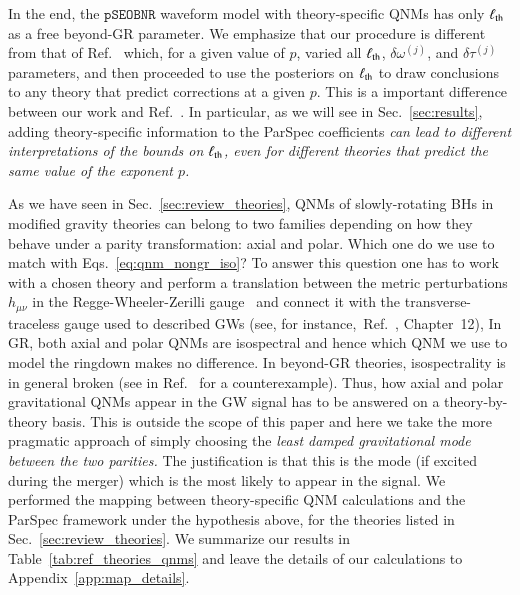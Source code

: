 \documentclass[twocolumn,
               prd,
               aps,
               superscriptaddress,
               tightenlines,
               nofootinbib,
               eqsecnum,
               amsfonts,
               amsmath,
               longbibliography]{revtex4-1}
\newcommand{\pSEOB}{\texttt{pSEOBNR}}
\begin{document}
In the end, the $\pSEOB$ waveform model with theory-specific
QNMs has only $\ell_{\rm th}$ as a free beyond-GR parameter.
%
We emphasize that our procedure is different from that of
Ref.~\cite{Carullo:2021dui} which, for a given value of $p$, varied all $\ell_{\rm th}$,
$\delta\omega^{(j)}$, and $\delta\tau^{(j)}$ parameters, and then proceeded
to use the posteriors on $\ell_{\rm th}$ to draw conclusions to any theory that predict
corrections at a given $p$.
%
This is a important difference between our work and Ref.~\cite{Carullo:2021dui}.
In particular, as we will see in Sec.~\ref{sec:results}, adding theory-specific
information to the ParSpec coefficients \emph{can lead to different interpretations
of the bounds on $\ell_{\rm th}$, even for different theories that predict the same
value of the exponent $p$.}

As we have seen in Sec.~\ref{sec:review_theories}, QNMs of slowly-rotating
BHs in modified gravity theories can belong to two families depending on how
they behave under a parity transformation: axial and polar. Which one do
we use to match with Eqs.~\eqref{eq:qnm_nongr_iso}?
%
To answer this question one has to work with a chosen theory and perform a
translation between the metric perturbations $h_{\mu\nu}$ in the
Regge-Wheeler-Zerilli gauge~\cite{Regge:1957td,Zerilli:1970se} and connect it with the transverse-traceless gauge
used to described GWs (see, for instance,~Ref.~\cite{Maggiore:2018sht}, Chapter~12),
%
In GR, both axial and polar QNMs are isospectral and hence which QNM we use to
model the ringdown makes no difference.
%
In beyond-GR theories, isospectrality is in general broken (see
in Ref.~\cite{Hui:2021cpm} for a counterexample).
%
Thus, how axial and polar gravitational QNMs appear in the GW signal has to be
answered on a theory-by-theory basis.
%
This is outside the scope of this paper and here we take the more pragmatic
approach of simply choosing the \emph{least damped gravitational mode between
the two parities.}
%
The justification is that this is the mode (if excited during the merger) which is
the most likely to appear in the signal.
We performed the mapping between theory-specific QNM calculations and the ParSpec framework
under the hypothesis above, for the theories listed in Sec.~\ref{sec:review_theories}.
%
We summarize our results in Table~\ref{tab:ref_theories_qnms} and
leave the details of our calculations to Appendix~\ref{app:map_details}.
\end{document}
